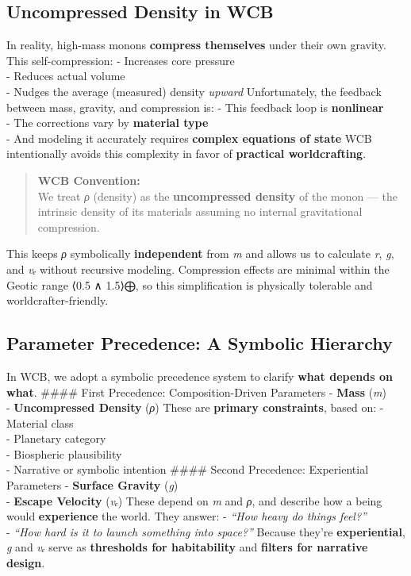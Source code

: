 \documentclass[
  letterpaper,
]{book}
\begin{document}
\subsection{Uncompressed Density in
WCB}\label{uncompressed-density-in-wcb}

In reality, high-mass monons \textbf{compress themselves} under their
own gravity. This self-compression: - Increases core pressure\\
- Reduces actual volume\\
- Nudges the average (measured) density \emph{upward} Unfortunately, the
feedback between mass, gravity, and compression is: - This feedback loop
is \textbf{nonlinear}\\
- The corrections vary by \textbf{material type}\\
- And modeling it accurately requires \textbf{complex equations of
state} WCB intentionally avoids this complexity in favor of
\textbf{practical worldcrafting}.

\begin{quote}
\textbf{WCB Convention:}\\
We treat \emph{ρ} (density) as the \textbf{uncompressed density} of the
monon --- the intrinsic density of its materials assuming no internal
gravitational compression.
\end{quote}

This keeps \emph{ρ} symbolically \textbf{independent} from \emph{m} and
allows us to calculate \emph{r}, \emph{g}, and \emph{vₑ} without
recursive modeling. Compression effects are minimal within the Geotic
range ⟨0.5 ∧ 1.5⟩⨁, so this simplification is physically tolerable and
worldcrafter-friendly.

\subsection{Parameter Precedence: A Symbolic
Hierarchy}\label{parameter-precedence-a-symbolic-hierarchy}

In WCB, we adopt a symbolic precedence system to clarify \textbf{what
depends on what}. \#\#\#\# First Precedence: Composition-Driven
Parameters - \textbf{Mass} (\emph{m})\\
- \textbf{Uncompressed Density} (\emph{ρ}) These are \textbf{primary
constraints}, based on: - Material class\\
- Planetary category\\
- Biospheric plausibility\\
- Narrative or symbolic intention \#\#\#\# Second Precedence:
Experiential Parameters - \textbf{Surface Gravity} (\emph{g})\\
- \textbf{Escape Velocity} (\emph{vₑ}) These depend on \emph{m} and
\emph{ρ}, and describe how a being would \textbf{experience} the world.
They answer: - \emph{``How heavy do things feel?''}\\
- \emph{``How hard is it to launch something into space?''} Because
they're \textbf{experiential}, \emph{g} and \emph{vₑ} serve as
\textbf{thresholds for habitability} and \textbf{filters for narrative
design}.
\end{document}
